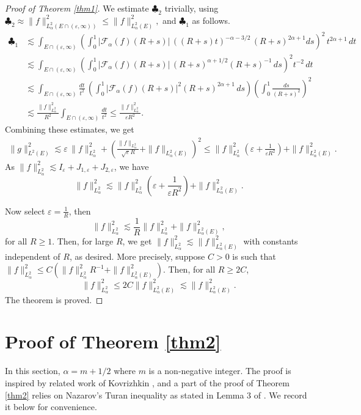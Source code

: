 \documentclass[11pt,a4paper,reqno,dvipsnames]{amsart}
\newcommand{\F}{\mathcal{F}}
\newcommand{\ep}{\varepsilon}
\renewcommand{\ge}{\geqslant}
\renewcommand{\le}{\leqslant}
\numberwithin{equation}{section}
\theoremstyle{plain}
\theoremstyle{definition}
\theoremstyle{remark}
\begin{document}
\begin{proof}[Proof of Theorem \ref{thm1}]
We estimate $\clubsuit_2$ trivially, using $\clubsuit_2 \approx  \|f\|^2_{L^2_\alpha(E \cap (\ep, \infty))} \le \|f\|^2_{L^2_\alpha(E)},$ and $\clubsuit_1$ as follows.
\begin{align*}
    \clubsuit_1 &\lesssim \int_{E \cap (\ep,\infty)} \left(\int_0^1 |\mathcal{F}_\alpha(f)(R+s)|\,  ((R+s)t)^{-\alpha-3/2}\, (R+s)^{2\alpha + 1} ds\right)^2 \, t^{2\alpha + 1}\, dt\\
    &\lesssim \int_{E \cap (\ep,\infty)} \left(\int_0^1 |\mathcal{F}_\alpha(f)(R+s)|\, (R+s)^{\alpha + 1/2} (R+s)^{-1}\, ds\right)^2 t^{-2}\, dt\\
    &\lesssim \int_{E \cap (\ep,\infty)} \frac{dt}{t^2} \, \left(\int_0^1|\F_\alpha(f)(R+s)|^2 (R+s)^{2\alpha + 1}\, ds\right) \left(\int_0^1 \frac{ds}{(R+s)^2}\right)^2\\
    &\lesssim \frac{\|f\|^2_{L^2_\alpha}}{R^2} \int_{E \cap (\ep,\infty)} \frac{dt}{t^2} \le \frac{\|f\|^2_{L^2_\alpha}}{\ep R^2}.
\end{align*}
Combining these estimates, we get
\begin{align*}
    \|g\|^2_{L^2(E)} \lesssim \ep\, \|f\|^2_{L^2_\alpha} + \left(\frac{\|f\|_{L^2_\alpha}}{\sqrt{\ep} R} + \|f\|_{L^2_\alpha(E)}\right)^2 \le \|f\|^2_{L^2_\alpha} \left(\ep + \frac{1}{\ep R^2} \right) + \|f\|^2_{L^2_\alpha(E)}.
\end{align*}
As $\|f\|^2_{L^2_\alpha} \lesssim I_\ep + J_{1,\ep} + J_{2, \ep}$, we have
$$\|f\|^2_{L^2_\alpha} \lesssim \|f\|^2_{L^2_\alpha}\left(\ep +  \frac{1}{\ep R^2}\right) + \|f\|^2_{L^2_\alpha(E)}.$$

Now select $\ep = \frac{1}{R}$, then
$$\|f\|^2_{L^2_\alpha} \lesssim \frac{1}{R}\|f\|^2_{L^2_\alpha} + \|f\|^2_{L^2_\alpha(E)},$$
for all $R \ge 1$. Then, for large $R$, we get $\|f\|^2_{L^2_\alpha} \lesssim \|f\|^2_{L^2_\alpha(E)}$ with constants independent of $R$, as desired. More precisely, suppose $C > 0$ is such that $\|f\|^2_{L^2_\alpha} \le  C(\|f\|^2_{L^2_\alpha} R^{-1} + \|f\|^2_{L^2_\alpha(E)})$.  Then, for all $R \ge 2C$, 
$$\|f\|^2_{L^2_\alpha}  \le 2C \|f\|^2_{L^2_\alpha(E)} \lesssim \|f\|^2_{L^2_\alpha(E)}.$$
The theorem is proved.
\end{proof}

\section{Proof of Theorem \ref{thm2}}

In this section, $\alpha = m+ 1/2$ where $m$ is a non-negative integer. The proof is inspired by related work of Kovrizhkin \cite{k1}, and a part of the proof of Theorem \ref{thm2} relies on Nazarov's Turan inequality as stated in Lemma 3 of \cite{k1}. We record it below for convenience.
\end{document}
